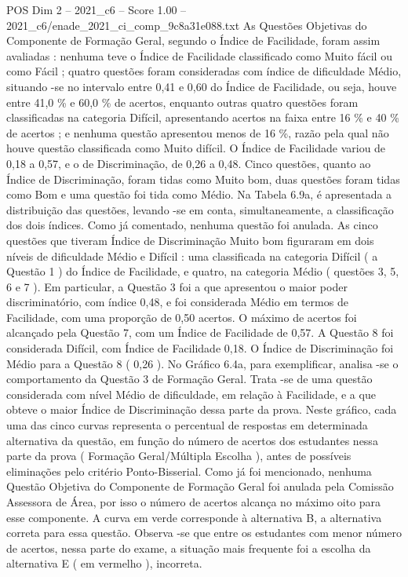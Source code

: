 \begin{textsample}{POS Dim 2 – 2021\_c6 – Score 1.00 – 2021\_c6/enade\_2021\_ci\_comp\_9c8a31e088.txt}
As Questões Objetivas do Componente de Formação Geral, segundo o Índice de Facilidade, foram assim avaliadas : nenhuma teve o Índice de Facilidade classificado como Muito fácil ou como Fácil ; quatro questões foram consideradas com índice de dificuldade Médio, situando -se no intervalo entre 0,41 e 0,60 do Índice de Facilidade, ou seja, houve entre 41,0 \% e 60,0 \% de acertos, enquanto outras quatro questões foram classificadas na categoria Difícil, apresentando acertos na faixa entre 16 \% e 40 \% de acertos ; e nenhuma questão apresentou menos de 16 \%, razão pela qual não houve questão classificada como Muito difícil.
O Índice de Facilidade variou de 0,18 a 0,57, e o de Discriminação, de 0,26 a 0,48.
Cinco questões, quanto ao Índice de Discriminação, foram tidas como Muito bom, duas questões foram tidas como Bom e uma questão foi tida como Médio.
Na Tabela 6.9a, é apresentada a distribuição das questões, levando -se em conta, simultaneamente, a classificação dos dois índices.
Como já comentado, nenhuma questão foi anulada.
As cinco questões que tiveram Índice de Discriminação Muito bom figuraram em dois níveis de dificuldade Médio e Difícil : uma classificada na categoria Difícil ( a Questão 1 ) do Índice de Facilidade, e quatro, na categoria Médio ( questões 3, 5, 6 e 7 ).
Em particular, a Questão 3 foi a que apresentou o maior poder discriminatório, com índice 0,48, e foi considerada Médio em termos de Facilidade, com uma proporção de 0,50 acertos.
O máximo de acertos foi alcançado pela Questão 7, com um Índice de Facilidade de 0,57.
A Questão 8 foi considerada Difícil, com Índice de Facilidade 0,18.
O Índice de Discriminação foi Médio para a Questão 8 ( 0,26 ).
No Gráfico 6.4a, para exemplificar, analisa -se o comportamento da Questão 3 de Formação Geral.
Trata -se de uma questão considerada com nível Médio de dificuldade, em relação à Facilidade, e a que obteve o maior Índice de Discriminação dessa parte da prova.
Neste gráfico, cada uma das cinco curvas representa o percentual de respostas em determinada alternativa da questão, em função do número de acertos dos estudantes nessa parte da prova ( Formação Geral/Múltipla Escolha ), antes de possíveis eliminações pelo critério Ponto-Bisserial.
Como já foi mencionado, nenhuma Questão Objetiva do Componente de Formação Geral foi anulada pela Comissão Assessora de Área, por isso o número de acertos alcança no máximo oito para esse componente.
A curva em verde corresponde à alternativa B, a alternativa correta para essa questão.
Observa -se que entre os estudantes com menor número de acertos, nessa parte do exame, a situação mais frequente foi a escolha da alternativa E ( em vermelho ), incorreta.

\end{textsample}

